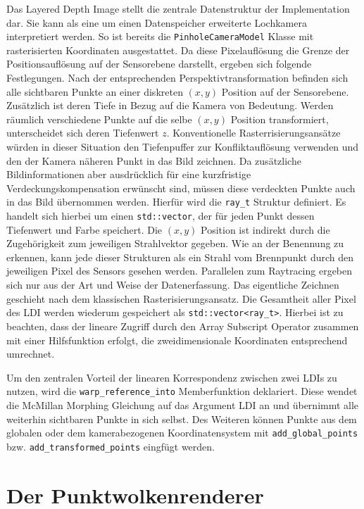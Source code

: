 \documentclass[hyperref, beleg, german, final, twoside]{cgvpub}
\begin{document}
Das Layered Depth Image stellt die zentrale Datenstruktur der Implementation
dar. Sie kann als eine um einen Datenspeicher erweiterte Lochkamera
interpretiert werden. So ist bereits die \texttt{Pinhole\-Camera\-Model} Klasse
mit rasterisierten Koordinaten ausgestattet. Da diese Pixelauflösung die Grenze
der Positionsauflösung auf der Sensorebene darstellt, ergeben sich folgende
Festlegungen. Nach der entsprechenden Perspektivtransformation befinden sich
alle sichtbaren Punkte an einer diskreten \( (x, y) \) Position auf der
Sensorebene. Zusätzlich ist deren Tiefe in Bezug auf die Kamera von Bedeutung.
Werden räumlich verschiedene Punkte auf die selbe \( (x,y) \) Position
transformiert, unterscheidet sich deren Tiefenwert \(z\). Konventionelle
Rasterrisierungsansätze würden in dieser Situation den Tiefenpuffer zur
Konfliktauflösung verwenden und den der Kamera näheren Punkt in das Bild
zeichnen. Da zusätzliche Bildinformationen aber ausdrücklich für eine
kurzfristige Verdeckungskompensation erwünscht sind, müssen diese verdeckten
Punkte auch in das Bild übernommen werden. Hierfür wird die \texttt{ray\_t}
Struktur definiert. Es handelt sich hierbei um einen \texttt{std::vector}, der
für jeden Punkt dessen Tiefenwert und Farbe speichert. Die \( (x,y) \) Position
ist indirekt durch die Zugehörigkeit zum jeweiligen Strahlvektor gegeben. Wie
an der Benennung zu erkennen, kann jede dieser Strukturen als ein Strahl vom
Brennpunkt durch den jeweiligen Pixel des Sensors gesehen werden. Parallelen
zum Raytracing ergeben sich nur aus der Art und Weise der Datenerfassung. Das
eigentliche Zeichnen geschieht nach dem klassischen Rasterisierungsansatz. Die
Gesamtheit aller Pixel des LDI werden wiederum gespeichert als
\texttt{std::vector<ray\_t>}. Hierbei ist zu beachten, dass der lineare Zugriff
durch den Array Subscript Operator zusammen mit einer Hilfsfunktion erfolgt,
die zweidimensionale Koordinaten entsprechend umrechnet.

Um den zentralen Vorteil der linearen Korrespondenz zwischen zwei LDIs zu
nutzen, wird die \texttt{warp\-\_reference\-\_into} Memberfunktion deklariert.
Diese wendet die McMillan Morphing Gleichung auf das Argument LDI an und
übernimmt alle weiterhin sichtbaren Punkte in sich selbst. Des Weiteren können
Punkte aus dem globalen oder dem kamerabezogenen Koordinatensystem mit
\texttt{add\-\_global\-\_points} bzw. \texttt{add\-\_transformed\-\_points}
eingfügt werden.

\section{Der Punktwolkenrenderer}
\end{document}
